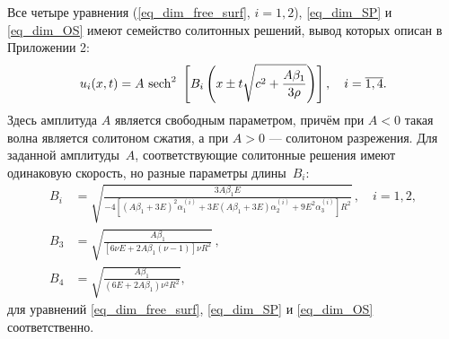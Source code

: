 \documentclass[12pt, a4paper]{report}
\begin{document}
Все четыре уравнения (\ref{eq_dim_free_surf}, $i=1,2$), \eqref{eq_dim_SP} и \eqref{eq_dim_OS} имеют семейство солитонных решений, вывод которых описан в Приложении 2:
\begin{equation}\label{soliton}
u_i(x,t) = A\ {\rm sech}^2\ \left[B_{i} \left(x\pm t \sqrt{c^2+\frac{A \beta_1}{3 \rho}}\right) \right], \quad i = \overline {1,4}.
\end{equation}
Здесь амплитуда $A$ является свободным параметром, причём при $A<0$ такая волна является солитоном сжатия, а при $A>0$ --- солитоном разрежения. Для заданной амплитуды~$A$, соответствующие солитонные решения имеют одинаковую скорость, но разные параметры длины~$B_i$:
\begin{align}
\label{Bi}
B_i &= \sqrt{\frac{3A\beta_1 E}{-4\left[(A\beta_1 + 3E)^2\alpha_1^{(i)} + 3E(A\beta_1 + 3E)\alpha_2^{(i)} + 9E^2\alpha_3^{(i)}\right] R^2}} \, , \quad i=1,2,\\
\label{B3}
B_3 &= \sqrt{\frac{A\beta_1}{\left[6\nu E + 2 A \beta_1 (\nu - 1)\right] \nu R^2}}\, , \\
\label{B4}
B_4 &= \sqrt{\frac{A\beta_1}{(6E + 2A\beta_1)\nu^2 R^2}},
\end{align}
для уравнений \eqref{eq_dim_free_surf}, \eqref{eq_dim_SP} и \eqref{eq_dim_OS} соответственно.
\end{document}

